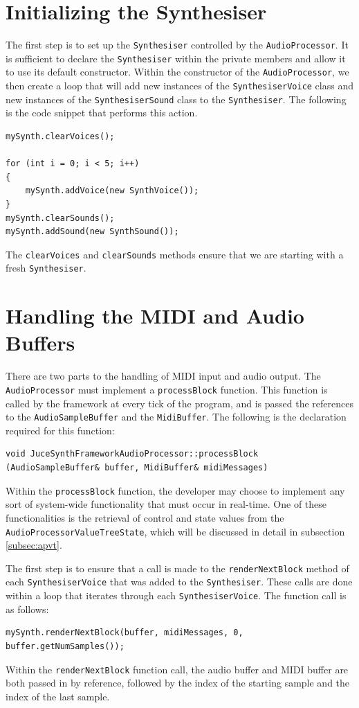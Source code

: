 \documentclass[a4paper,12pt]{report}
\begin{document}
\section{Initializing the Synthesiser}
\label{sec:initializesynthesizer}
The first step is to set up the \texttt{Synthesiser} controlled by the \texttt{AudioProcessor}. It is sufficient to declare the \texttt{Synthesiser} within the private members and allow it to use its default constructor. 
Within the constructor of the \texttt{AudioProcessor}, we then create a loop that will add new instances of the \texttt{SynthesiserVoice} class and new instances of the \texttt{SynthesiserSound} class to the \texttt{Synthesiser}. The following is the code snippet that performs this action.
\begin{lstlisting}[caption={Instantiating Voices},label={code:instantiatingvoices},captionpos=b]
mySynth.clearVoices();
    
for (int i = 0; i < 5; i++)
{
    mySynth.addVoice(new SynthVoice());
}
mySynth.clearSounds();
mySynth.addSound(new SynthSound());
\end{lstlisting}
The \texttt{clearVoices} and \texttt{clearSounds} methods ensure that we are starting with a fresh \texttt{Synthesiser}.

\section{Handling the MIDI and Audio Buffers}
\label{sec:handlingbuffers}
There are two parts to the handling of MIDI input and audio output. The \texttt{AudioProcessor} must implement a \texttt{processBlock} function. This function is called by the framework at every tick of the program, and is passed the references to the \texttt{AudioSampleBuffer} and the \texttt{MidiBuffer}. The following is the declaration required for this function:
\begin{lstlisting}[caption={processBlock Declaration},label={code:processblockdeclaration},captionpos=b]
void JuceSynthFrameworkAudioProcessor::processBlock (AudioSampleBuffer& buffer, MidiBuffer& midiMessages)
\end{lstlisting}
Within the \texttt{processBlock} function, the developer may choose to implement any sort of system-wide functionality that must occur in real-time. One of these functionalities is the retrieval of control and state values from the \texttt{AudioProcessorValueTreeState}, which will be discussed in detail in subsection \ref{subsec:apvt}.

The first step is to ensure that a call is made to the \texttt{renderNextBlock} method of each \texttt{SynthesiserVoice} that was added to the \texttt{Synthesiser}. These calls are done within a loop that iterates through each \texttt{SynthesiserVoice}. The function call is as follows: 
\begin{lstlisting}[caption={renderNextBlock Function Call},label={code:rendernextblockfunccall},captionpos=b]
mySynth.renderNextBlock(buffer, midiMessages, 0, buffer.getNumSamples());
\end{lstlisting}
Within the \texttt{renderNextBlock} function call, the audio buffer and MIDI buffer are both passed in by reference, followed by the index of the starting sample and the index of the last sample.
\end{document}

